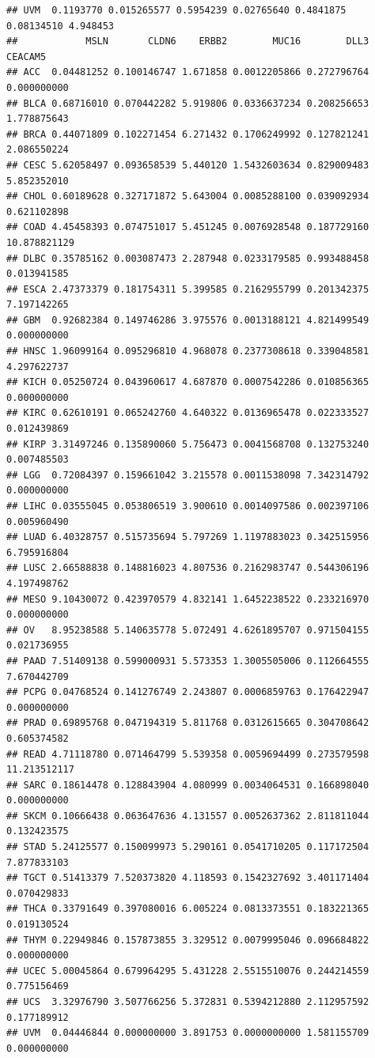 \documentclass[
]{book}
\begin{document}
\begin{verbatim}
## UVM  0.1193770 0.015265577 0.5954239 0.02765640 0.4841875 0.08134510 4.948453
##            MSLN       CLDN6    ERBB2        MUC16        DLL3      CEACAM5
## ACC  0.04481252 0.100146747 1.671858 0.0012205866 0.272796764  0.000000000
## BLCA 0.68716010 0.070442282 5.919806 0.0336637234 0.208256653  1.778875643
## BRCA 0.44071809 0.102271454 6.271432 0.1706249992 0.127821241  2.086550224
## CESC 5.62058497 0.093658539 5.440120 1.5432603634 0.829009483  5.852352010
## CHOL 0.60189628 0.327171872 5.643004 0.0085288100 0.039092934  0.621102898
## COAD 4.45458393 0.074751017 5.451245 0.0076928548 0.187729160 10.878821129
## DLBC 0.35785162 0.003087473 2.287948 0.0233179585 0.993488458  0.013941585
## ESCA 2.47373379 0.181754311 5.399585 0.2162955799 0.201342375  7.197142265
## GBM  0.92682384 0.149746286 3.975576 0.0013188121 4.821499549  0.000000000
## HNSC 1.96099164 0.095296810 4.968078 0.2377308618 0.339048581  4.297622737
## KICH 0.05250724 0.043960617 4.687870 0.0007542286 0.010856365  0.000000000
## KIRC 0.62610191 0.065242760 4.640322 0.0136965478 0.022333527  0.012439869
## KIRP 3.31497246 0.135890060 5.756473 0.0041568708 0.132753240  0.007485503
## LGG  0.72084397 0.159661042 3.215578 0.0011538098 7.342314792  0.000000000
## LIHC 0.03555045 0.053806519 3.900610 0.0014097586 0.002397106  0.005960490
## LUAD 6.40328757 0.515735694 5.797269 1.1197883023 0.342515956  6.795916804
## LUSC 2.66588838 0.148816023 4.807536 0.2162983747 0.544306196  4.197498762
## MESO 9.10430072 0.423970579 4.832141 1.6452238522 0.233216970  0.000000000
## OV   8.95238588 5.140635778 5.072491 4.6261895707 0.971504155  0.021736955
## PAAD 7.51409138 0.599000931 5.573353 1.3005505006 0.112664555  7.670442709
## PCPG 0.04768524 0.141276749 2.243807 0.0006859763 0.176422947  0.000000000
## PRAD 0.69895768 0.047194319 5.811768 0.0312615665 0.304708642  0.605374582
## READ 4.71118780 0.071464799 5.539358 0.0059694499 0.273579598 11.213512117
## SARC 0.18614478 0.128843904 4.080999 0.0034064531 0.166898040  0.000000000
## SKCM 0.10666438 0.063647636 4.131557 0.0052637362 2.811811044  0.132423575
## STAD 5.24125577 0.150099973 5.290161 0.0541710205 0.117172504  7.877833103
## TGCT 0.51413379 7.520373820 4.118593 0.1542327692 3.401171404  0.070429833
## THCA 0.33791649 0.397080016 6.005224 0.0813373551 0.183221365  0.019130524
## THYM 0.22949846 0.157873855 3.329512 0.0079995046 0.096684822  0.000000000
## UCEC 5.00045864 0.679964295 5.431228 2.5515510076 0.244214559  0.775156469
## UCS  3.32976790 3.507766256 5.372831 0.5394212880 2.112957592  0.177189912
## UVM  0.04446844 0.000000000 3.891753 0.0000000000 1.581155709  0.000000000

\end{verbatim}
\end{document}
